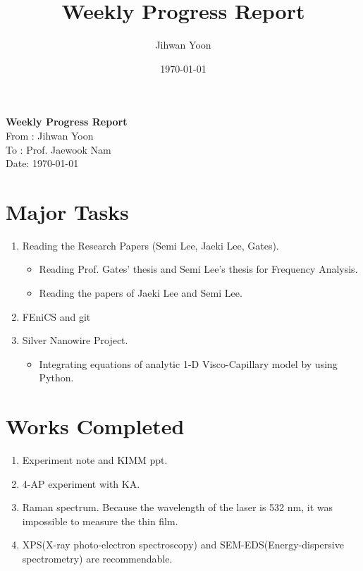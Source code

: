 \documentclass{article}
\title{Weekly Progress Report}
\author{Jihwan Yoon}
\date{\today}
\begin{document}
\begin{center}
 {\LARGE \bf Weekly Progress Report}\\[15pt]
 {\Large From : Jihwan Yoon\\[5pt]  To : Prof. Jaewook Nam\\[10pt] Date: \today}\\[30pt]
\end{center}


\section{Major Tasks}
\begin{enumerate}
 \item Reading the Research Papers (Semi Lee, Jaeki Lee, Gates).
       \begin{itemize}
        \item Reading Prof. Gates' thesis\cite{gates1999slot} and Semi Lee's thesis for Frequency Analysis.
        \item Reading the papers of Jaeki Lee\cite{lee2016simple} and Semi Lee\cite{lee2015analysis}.
       \end{itemize}
 \item FEniCS and git
 \item Silver Nanowire Project.
       \begin{itemize}
        \item Integrating equations of analytic 1-D Visco-Capillary model by using Python.
       \end{itemize}
\end{enumerate}
\vspace{5mm}


\section{Works Completed}
\begin{enumerate}
\item Experiment note and KIMM ppt.
 \item 4-AP experiment with KA.
 \item Raman spectrum. Because the wavelength of the laser is 532 nm, it was impossible to measure the thin film.
 \item XPS(X-ray photo-electron spectroscopy) and SEM-EDS(Energy-dispersive spectrometry) are recommendable. 
\end{enumerate}


\vspace{5mm}
\end{document}
